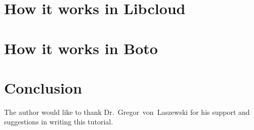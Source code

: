 \section{How it works in Libcloud}

\section{How it works in Boto}

\section{Conclusion}

\begin{acks}

The author would like to thank Dr.~Gregor~von~Laszewski for his support and 
suggestions in writing this tutorial.

\end{acks}


 

